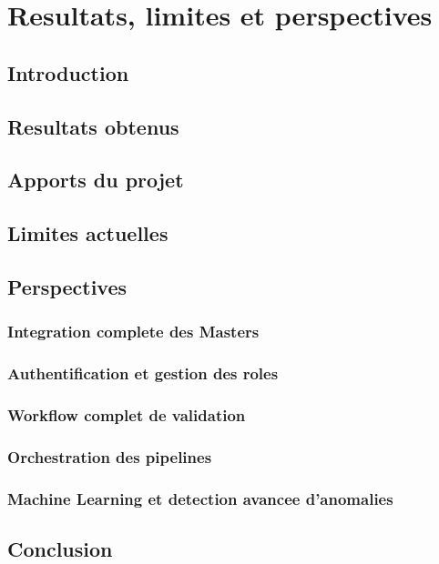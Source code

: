 \chapter{Resultats, limites et perspectives}

\section{Introduction}

\section{Resultats obtenus}

\section{Apports du projet}

\section{Limites actuelles}

\section{Perspectives}

\subsection{Integration complete des Masters}

\subsection{Authentification et gestion des roles}

\subsection{Workflow complet de validation}

\subsection{Orchestration des pipelines}

\subsection{Machine Learning et detection avancee d'anomalies}

\section{Conclusion}


